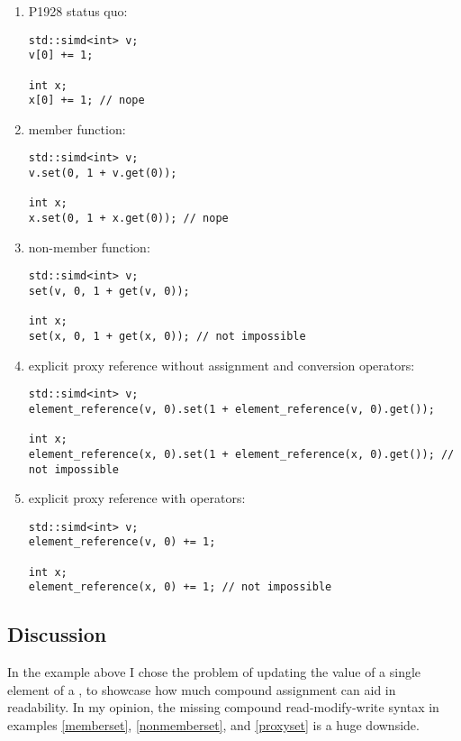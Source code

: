 \begin{enumerate}
  \item P1928 status quo:\label{explP1928}
\medskip\begin{lstlisting}[style=Vc]
std::simd<int> v;
v[0] += 1;

int x;
x[0] += 1; // nope
\end{lstlisting}

\item {} member function:\label{memberset}
\medskip\begin{lstlisting}[style=Vc]
std::simd<int> v;
v.set(0, 1 + v.get(0));

int x;
x.set(0, 1 + x.get(0)); // nope
\end{lstlisting}

\item {} non-member function:\label{nonmemberset}
\medskip\begin{lstlisting}[style=Vc]
std::simd<int> v;
set(v, 0, 1 + get(v, 0));

int x;
set(x, 0, 1 + get(x, 0)); // not impossible
\end{lstlisting}

\item explicit proxy reference without assignment and conversion operators:\label{proxyset}
\medskip\begin{lstlisting}[style=Vc]
std::simd<int> v;
element_reference(v, 0).set(1 + element_reference(v, 0).get());

int x;
element_reference(x, 0).set(1 + element_reference(x, 0).get()); // not impossible
\end{lstlisting}

\item explicit proxy reference with operators:\label{proxyoperators}
\medskip\begin{lstlisting}[style=Vc]
std::simd<int> v;
element_reference(v, 0) += 1;

int x;
element_reference(x, 0) += 1; // not impossible
\end{lstlisting}

\end{enumerate}

\subsection{Discussion}
In the example above I chose the problem of updating the value of a single
element of a \simd, to showcase how much compound assignment can aid in
readability.
In my opinion, the missing compound read-modify-write syntax in examples
\ref{memberset}, \ref{nonmemberset}, and \ref{proxyset} is a huge downside.

